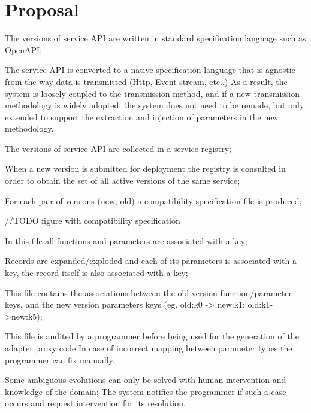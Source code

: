 
%

\chapter{Proposal}
\label{cha:proposal}

The versions of service API are written in standard specification language such as OpenAPI;

The service API is converted to a native specification language that is agnostic from the way data is transmitted (Http, Event stream, etc..)
As a result, the system is loosely coupled to the transmission method, and if a new transmission methodology is widely adopted, the system does not need to be remade,
but only extended to support the extraction and injection of parameters in the new methodology.

The versions of service API are collected in a service registry;

When a new version is submitted for deployment the registry is consulted in order to obtain the set of all active versions of the same service;

For each pair of versions (new, old) a compatibility specification file is produced;

//TODO figure with compatibility specification

In this file all functions and parameters are associated with a key;

Records are expanded/exploded and each of its parameters is associated with a key, the record itself is also associated with a key;

This file contains the associations between the old version function/parameter keys, and the new version parameters keys (eg. old:k0 -> new:k1; old:k1->new:k5);

This file is audited by a programmer before being used for the generation of the adapter proxy code
In case of incorrect mapping between parameter types the programmer can fix manually.

Some ambiguous evolutions can only be solved with human intervention and knowledge of the domain;
The system notifies the programmer if such a case occurs and request intervention for its resolution.

